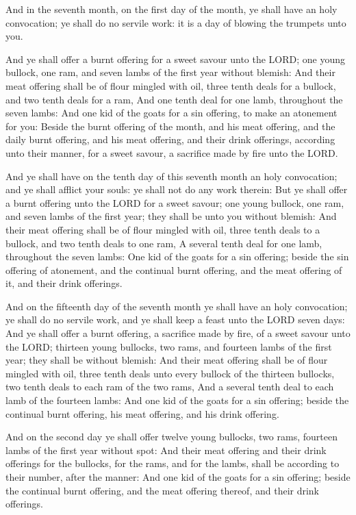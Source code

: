 \Chapter
\Verse And in the seventh month, on the first day of the month, ye shall
have an holy convocation; ye shall do no servile work: it is a day of
blowing the trumpets unto you.

\Verse And ye shall offer a burnt offering for a sweet savour unto the
LORD; one young bullock, one ram, and seven lambs of the first year
without blemish: \Verse And their meat offering shall be of flour
mingled with oil, three tenth deals for a bullock, and two tenth deals
for a ram, \Verse And one tenth deal for one lamb, throughout the seven
lambs: \Verse And one kid of the goats for a sin offering, to make an
atonement for you: \Verse Beside the burnt offering of the month, and
his meat offering, and the daily burnt offering, and his meat
offering, and their drink offerings, according unto their manner, for
a sweet savour, a sacrifice made by fire unto the LORD.

\Verse And ye shall have on the tenth day of this seventh month an holy
convocation; and ye shall afflict your souls: ye shall not do any work
therein: \Verse But ye shall offer a burnt offering unto the LORD for a
sweet savour; one young bullock, one ram, and seven lambs of the first
year; they shall be unto you without blemish: \Verse And their meat
offering shall be of flour mingled with oil, three tenth deals to a
bullock, and two tenth deals to one ram, \Verse A several tenth deal
for one lamb, throughout the seven lambs: \Verse One kid of the goats
for a sin offering; beside the sin offering of atonement, and the
continual burnt offering, and the meat offering of it, and their drink
offerings.

\Verse And on the fifteenth day of the seventh month ye shall have an
holy convocation; ye shall do no servile work, and ye shall keep a
feast unto the LORD seven days: \Verse And ye shall offer a burnt
offering, a sacrifice made by fire, of a sweet savour unto the LORD;
thirteen young bullocks, two rams, and fourteen lambs of the first
year; they shall be without blemish: \Verse And their meat offering
shall be of flour mingled with oil, three tenth deals unto every
bullock of the thirteen bullocks, two tenth deals to each ram of the
two rams, \Verse And a several tenth deal to each lamb of the fourteen
lambs: \Verse And one kid of the goats for a sin offering; beside the
continual burnt offering, his meat offering, and his drink offering.

\Verse And on the second day ye shall offer twelve young bullocks, two
rams, fourteen lambs of the first year without spot: \Verse And their
meat offering and their drink offerings for the bullocks, for the
rams, and for the lambs, shall be according to their number, after the
manner: \Verse And one kid of the goats for a sin offering; beside the
continual burnt offering, and the meat offering thereof, and their
drink offerings.

